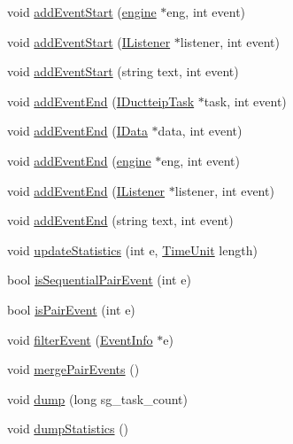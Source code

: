 \begin{DoxyCompactItemize}
\item 
void \hyperlink{class_ductteip_log_ab89eac3be95eb5663a8f752413f6b0d0}{addEventStart} (\hyperlink{classengine}{engine} $\ast$eng, int event)
\item 
void \hyperlink{class_ductteip_log_aeb089df178933400cffbbf46a1352e69}{addEventStart} (\hyperlink{class_i_listener}{IListener} $\ast$listener, int event)
\item 
void \hyperlink{class_ductteip_log_a0a24d89a29b40756975c3190f011b30f}{addEventStart} (string text, int event)
\item 
void \hyperlink{class_ductteip_log_a9a010d4387f7f74b848d5c36aaacd501}{addEventEnd} (\hyperlink{class_i_ductteip_task}{IDuctteipTask} $\ast$task, int event)
\item 
void \hyperlink{class_ductteip_log_a03ef2af6f52a01927e841df2399e995e}{addEventEnd} (\hyperlink{class_i_data}{IData} $\ast$data, int event)
\item 
void \hyperlink{class_ductteip_log_a97b60b9f85253cdb916a0b2fed7b02ef}{addEventEnd} (\hyperlink{classengine}{engine} $\ast$eng, int event)
\item 
void \hyperlink{class_ductteip_log_a549a774edcd230c2e47b21e78133a168}{addEventEnd} (\hyperlink{class_i_listener}{IListener} $\ast$listener, int event)
\item 
void \hyperlink{class_ductteip_log_a0a536783ee78831d30dc9dd6d41a674f}{addEventEnd} (string text, int event)
\item 
void \hyperlink{class_ductteip_log_a8c685fe96e233dfc3f2be278cdc6d340}{updateStatistics} (int e, \hyperlink{basic_8hpp_ac0ec6c8e4757751eaaa618bbf62ab6c9}{TimeUnit} length)
\item 
bool \hyperlink{class_ductteip_log_acca92822b7606cc0c5d384a3d96c7950}{isSequentialPairEvent} (int e)
\item 
bool \hyperlink{class_ductteip_log_a9dcfe59dfa97907c6464456bafe1fb7d}{isPairEvent} (int e)
\item 
void \hyperlink{class_ductteip_log_a91792b3bdcea6336ee43c7da8872879f}{filterEvent} (\hyperlink{struct_event_info}{EventInfo} $\ast$e)
\item 
void \hyperlink{class_ductteip_log_a3062026052a3d861e37f7703808b4e29}{mergePairEvents} ()
\item 
void \hyperlink{class_ductteip_log_ade6cb12a251c5e220725999980b16566}{dump} (long sg\_\-task\_\-count)
\item 
void \hyperlink{class_ductteip_log_a7f6153345afe4d8ecf0e4f066c77fb33}{dumpStatistics} ()
\item 

\end{DoxyCompactItemize}
